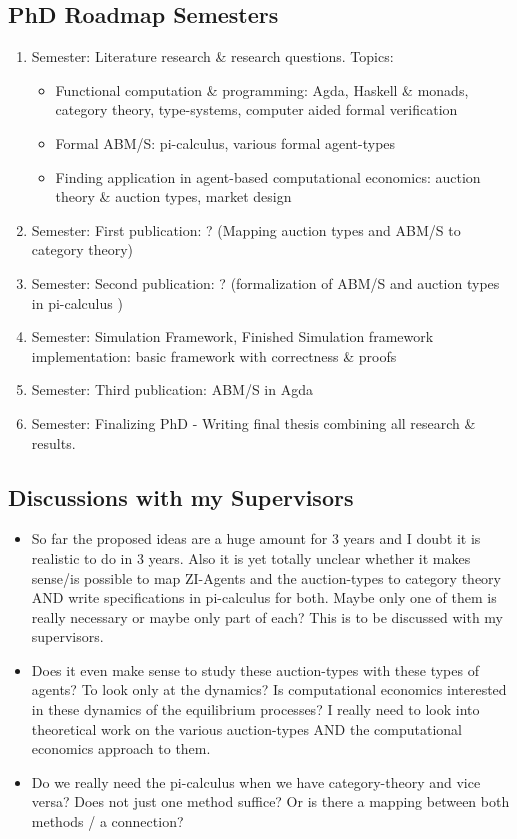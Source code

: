 \subsection*{PhD Roadmap Semesters}
\begin{enumerate}
\item Semester: Literature research \& research questions. Topics: 
	\begin{itemize}
	\item Functional computation \& programming: Agda, Haskell \& monads, category theory, type-systems, computer aided formal verification 
	\item Formal ABM/S: pi-calculus, various formal agent-types
	\item Finding application in agent-based computational economics: auction theory \& auction types, market design
	\end{itemize}
\item Semester: First publication: ? (Mapping auction types and ABM/S to category theory)
\item Semester: Second publication: ? (formalization of ABM/S and auction types in pi-calculus )
\item Semester: Simulation Framework, Finished Simulation framework implementation: basic framework with correctness \& proofs 
\item Semester: Third publication: ABM/S in Agda
\item Semester: Finalizing PhD - Writing final thesis combining all research \& results.
\end{enumerate}

\subsection*{Discussions with my Supervisors}
\begin{itemize}
\item So far the proposed ideas are a huge amount for 3 years and I doubt it is realistic to do in 3 years. Also it is yet totally unclear whether it makes sense/is possible to map ZI-Agents and the auction-types to category theory AND write specifications in pi-calculus for both. Maybe only one of them is really necessary or maybe only part of each? This is to be discussed with my supervisors.
\item Does it even make sense to study these auction-types with these types of agents? To look only at the dynamics? Is computational economics interested in these dynamics of the equilibrium processes? I really need to look into theoretical work on the various auction-types AND the computational economics approach to them.
\item Do we really need the pi-calculus when we have category-theory and vice versa? Does not just one method suffice? Or is there a mapping between both methods / a connection?
\end{itemize}